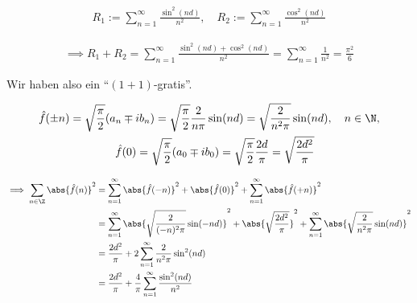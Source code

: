 \begin{solution}
\begin{enumerate}[label = \arabic*.]
    \begin{align*}
        R_1
        :=
        \sum_{n=1}^\infty
        \frac{\sin^2(n d)}{n^2},
        \quad
        R_2
        :=
        \sum_{n=1}^\infty
        \frac{\cos^2(n d)}{n^2}
    \end{align*}
    
    \begin{align*}
        \implies
        R_1 + R_2
        =
        \sum_{n=1}^\infty
        \frac
        {
            \sin^2(n d)
            +
            \cos^2(n d)
        }{n^2}    
        =
        \sum_{n=1}^\infty
        \frac{1}{n^2}
        =
        \frac{\pi^2}{6}
    \end{align*}
    
    Wir haben also ein \enquote{$(1 + 1)$-gratis}.

    \begin{gather*}
        \hat f(\pm n)
        =
        \sqrt \frac{\pi}{2}
        (a_n \mp i b_n)
        =
        \sqrt \frac{\pi}{2}
        \frac{2}{n \pi}
        \sin(n d)
        =
        \sqrt \frac{2}{n^2 \pi}
        \sin(n d),
        \quad
        n \in \N, \\
        \quad
        \hat f(0)
        =
        \sqrt \frac{\pi}{2}
        (a_0 \mp i b_0)
        =
        \sqrt \frac{\pi}{2}
        \frac{2 d}{\pi}
        =
        \sqrt \frac{2 d^2}{\pi}
    \end{gather*}

    \begin{align*}
        \implies
        \sum_{n \in \Z}
        \abs{\hat f(n)}^2
        & =
        \sum_{n=1}^\infty
        \abs{\hat f(-n)}^2
        +
        \abs{\hat f(0)}^2
        +
        \sum_{n=1}^\infty
        \abs{\hat f(+n)}^2 \\
        & =
        \sum_{n=1}^\infty
        \abs
        {
            \sqrt \frac{2}{(-n)^2 \pi}
            \sin(-n d)  
        }^2
        +
        \abs
        {
            \sqrt \frac{2 d^2}{\pi}
        }^2
        +
        \sum_{n=1}^\infty
        \abs
        {
            \sqrt \frac{2}{n^2 \pi}
            \sin(n d)   
        }^2 \\
        & =
        \frac{2 d^2}{\pi}
        +
        2 \sum_{n=1}^\infty
        \frac{2}{n^2 \pi}
        \sin^2(n d) \\
        & =
        \frac{2 d^2}{\pi}
        +
        \frac{4}{\pi}
        \sum_{n=1}^\infty
        \frac
        {
            \sin^2(n d)
        }{n^2}
    \end{align*}


\end{enumerate}
\end{solution}
